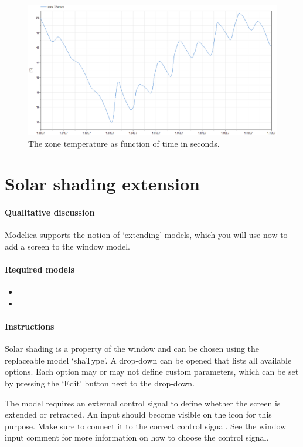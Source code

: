 \documentclass[10pt,a4paper]{article}
\begin{document}
\begin{figure}
\centering
\includegraphics[scale=0.6]{Example1.png}
\caption{The zone temperature as function of time in seconds.}
\label{fig:res1}
\end{figure}


\section{Solar shading extension}
\paragraph{Qualitative discussion}
Modelica supports the notion of `extending' models, which you will
use now to add a screen to the window model.


\paragraph{Required models}
\begin{itemize}
\item {}
\item {}
\end{itemize}

\paragraph{Instructions}
Solar shading is a property of the window and can be chosen using the 
replaceable model `shaType'. 
A drop-down can be opened that lists all available options.
Each option may or may not define custom parameters,
which can be set by pressing the `Edit' button next to the drop-down.

The  model requires an external control signal to define
whether the screen is extended or retracted. 
An input should become visible on the  icon for this
purpose. Make sure to connect it to the correct control signal.
See the window input comment for more information on how
to choose the control signal.
\end{document}
